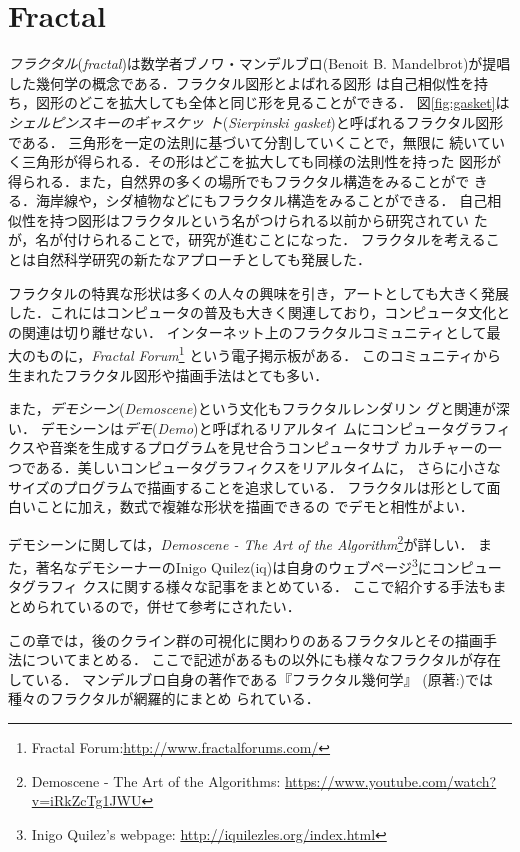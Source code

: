 
\section{Fractal}

\emph{フラクタル}(\textit{fractal})は数学者ブノワ・マンデルブロ(Benoit
B. Mandelbrot)が提唱した幾何学の概念である．フラクタル図形とよばれる図形
は自己相似性を持ち，図形のどこを拡大しても全体と同じ形を見ることができる．
図\ref{fig:gasket}は\emph{シェルピンスキーのギャスケッ
ト}(\textit{Sierpinski gasket})と呼ばれるフラクタル図形である．
三角形を一定の法則に基づいて分割していくことで，無限に
続いていく三角形が得られる．その形はどこを拡大しても同様の法則性を持った
図形が得られる．また，自然界の多くの場所でもフラクタル構造をみることがで
きる．海岸線や，シダ植物などにもフラクタル構造をみることができる．
自己相似性を持つ図形はフラクタルという名がつけられる以前から研究されてい
たが，名が付けられることで，研究が進むことになった．
フラクタルを考えることは自然科学研究の新たなアプローチとしても発展した．

フラクタルの特異な形状は多くの人々の興味を引き，アートとしても大きく発展
した．これにはコンピュータの普及も大きく関連しており，コンピュータ文化と
の関連は切り離せない．
インターネット上のフラクタルコミュニティとして最大のものに，\textit{Fractal
Forum}\footnote{Fractal Forum:\url{http://www.fractalforums.com/}}
という電子掲示板がある．
このコミュニティから生まれたフラクタル図形や描画手法はとても多い．

また，\emph{デモシーン}(\textit{Demoscene})という文化もフラクタルレンダリン
グと関連が深い．
デモシーンは\emph{デモ}(\textit{Demo})と呼ばれるリアルタイ
ムにコンピュータグラフィクスや音楽を生成するプログラムを見せ合うコンピュータサブ
カルチャーの一つである．美しいコンピュータグラフィクスをリアルタイムに，
さらに小さなサイズのプログラムで描画することを追求している．
フラクタルは形として面白いことに加え，数式で複雑な形状を描画できるの
でデモと相性がよい．

デモシーンに関しては，\textit{Demoscene - The
Art of the Algorithm}\footnote{Demoscene - The Art of the Algorithms:
 \url{https://www.youtube.com/watch?v=iRkZcTg1JWU}}が詳しい．
また，著名なデモシーナーのInigo Quilez(iq)は自身のウェブページ\footnote{Inigo
Quilez's webpage: \url{http://iquilezles.org/index.html}}にコンピュータグラフィ
クスに関する様々な記事をまとめている．
ここで紹介する手法もまとめられているので，併せて参考にされたい．

この章では，後のクライン群の可視化に関わりのあるフラクタルとその描画手
法についてまとめる．
ここで記述があるもの以外にも様々なフラクタルが存在している．
マンデルブロ自身の著作である『フラクタル幾何学』
\cite{mandelbrot-ja-201102-1}
\cite{mandelbrot-ja-201102-2}
(原著:\cite{mandelbrot1983fractal})では種々のフラクタルが網羅的にまとめ
られている．

